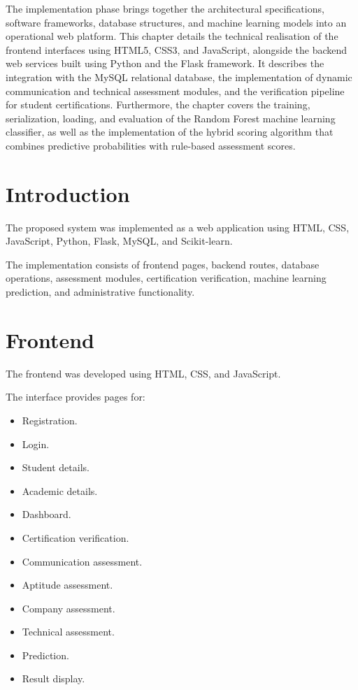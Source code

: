 \documentclass[12pt,a4paper]{report}
\begin{document}
The implementation phase brings together the architectural specifications,
software frameworks, database structures, and machine learning models into an
operational web platform. This chapter details the technical realisation of
the frontend interfaces using HTML5, CSS3, and JavaScript, alongside the backend
web services built using Python and the Flask framework. It describes the
integration with the MySQL relational database, the implementation of dynamic
communication and technical assessment modules, and the verification pipeline
for student certifications. Furthermore, the chapter covers the training,
serialization, loading, and evaluation of the Random Forest machine learning
classifier, as well as the implementation of the hybrid scoring algorithm that
combines predictive probabilities with rule-based assessment scores.

\section{Introduction}

The proposed system was implemented as a web application using
HTML, CSS, JavaScript, Python, Flask, MySQL, and Scikit-learn.

The implementation consists of frontend pages, backend routes,
database operations, assessment modules, certification
verification, machine learning prediction, and administrative
functionality.

\section{Frontend}

The frontend was developed using HTML, CSS, and JavaScript.

The interface provides pages for:

\begin{itemize}
    \item Registration.
    \item Login.
    \item Student details.
    \item Academic details.
    \item Dashboard.
    \item Certification verification.
    \item Communication assessment.
    \item Aptitude assessment.
    \item Company assessment.
    \item Technical assessment.
    \item Prediction.
    \item Result display.
\end{itemize}
\end{document}
